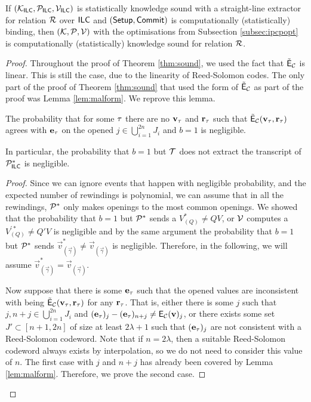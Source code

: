   
      \begin{theorem}
    If $(\mathcal{K}_{\mathsf{ILC}},\mathcal{P}_{\mathsf{ILC}},\mathcal{V}_{\mathsf{ILC}})$ is statistically knowledge sound with a straight-line extractor for relation $\mathcal{R}$ over $\mathsf{ILC}$ and $(\mathsf{Setup},\mathsf{Commit})$ is computationally (statistically) binding, then $(\mathcal{K},\mathcal{P},\mathcal{V})$ with the optimisations from Subsection \ref{subsec:ipcpopt} is computationally (statistically) knowledge sound for relation $\mathcal{R}$.
    \end{theorem}   
    \begin{proof}

Throughout the proof of Theorem \ref{thm:sound}, we used the fact that $\tilde{\mathsf{E}}_{\mathcal{C}}$ is linear. This is still the case, due to the linearity of Reed-Solomon codes. The only part of the proof of Theorem \ref{thm:sound} that used the form of $\tilde{\mathsf{E}}_{\mathcal{C}}$ as part of the proof was Lemma \ref{lem:malform}. We reprove this lemma.

\begin{lemma}
The probability that for some $\tau$ there are no $\mathbf{v}_\tau$ and $\mathbf{r}_\tau$ such that $\tilde{\mathsf{E}}_{\mathcal{C}}(\mathbf{v}_\tau,\mathbf{r}_\tau)$ agrees with $\mathbf{e}_\tau$ on the opened $j\in \bigcup_{i=1}^{2n}J_i$ and $b=1$ is negligible. 

In particular, the probability that $b=1$ but $\mathcal{T}$ does not extract the transcript of $\mathcal{P}_{\mathsf{ILC}}^*$ is negligible. 
\end{lemma}
\begin{proof}
Since we can ignore events that happen with negligible probability, and the expected number of rewindings is polynomial, we can assume that in all the rewindings, $\mathcal{P}^*$ only makes openings to the most common openings. 
We showed that the probability that $b=1$ but $\mathcal{P}^*$ sends a $V_{(Q)}^*\neq QV$, or $\mathcal{V}$ computes a $V_{(Q)}^{'*}\neq Q'V$ is negligible and by the same argument the probability that $b=1$ but $\mathcal{P}^*$ sends
$\vec{v}^*_{(\vec{\gamma})}\neq \vec{v}_{(\vec{\gamma})}$ is negligible. Therefore, in the following, we will assume $\vec{v}^*_{(\vec{\gamma})}=\vec{v}_{(\vec{\gamma})}$.

Now suppose that there is some $\mathbf{e}_{\tau}$ such that the opened values are inconsistent with being $\tilde{\mathsf{E}}_{\mathcal{C}}(\mathbf{v}_\tau,\mathbf{r}_\tau)$ for any $\mathbf{r}_{\tau}$. That is, either there is some $j$ such that $j,n+j\in \bigcup_{i=1}^{2n}J_i$ and $(\mathbf{e}_{\tau})_j-(\mathbf{e}_{\tau})_{n+j}\neq \mathsf{E}_{\mathcal{C}}(\mathbf{v})_j$, or there exists some set $J' \subset [n+1,2n]$ of size at least $2\lambda +1$ such that $(\mathbf{e}_{\tau})_j$ are not consistent with a Reed-Solomon codeword. Note that if $n = 2\lambda$, then a suitable Reed-Solomon codeword always exists by interpolation, so we do not need to consider this value of $n$. The first case with $j$ and $n+j$ has already been covered by Lemma \ref{lem:malform}. Therefore, we prove the second case.


\end{proof}
\end{proof}
